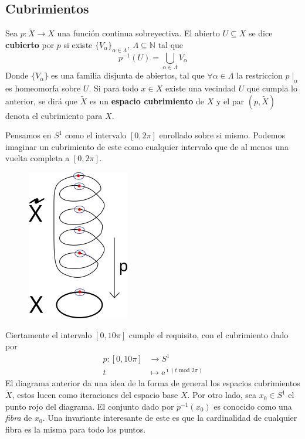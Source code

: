 \subsection{Cubrimientos}
\begin{definicion} \label{def:cubierta}
Sea \(p : \tilde{X} \to X\) una función continua sobreyectiva. El
abierto \(U \subseteq X\) se dice \textbf{cubierto} por \(p\)
si existe \(\{V_\alpha\}_{\alpha \in \Lambda},\ \Lambda \subseteq
\mathbb N\) tal que
\[ p^{-1} (U) = \bigcup_{\alpha \in \Lambda} V_\alpha \]
Donde \(\{V_\alpha\}\) es una familia disjunta de abiertos, tal que
\(\forall \alpha \in \Lambda\) la restriccion \( p \mid_{\alpha}\) es
homeomorfa sobre \(U\). Si para todo \(x \in X\) existe una vecindad
\(U\) que cumpla lo anterior, se dirá que \(\tilde{X}\) es un
\textbf{espacio cubrimiento} de \(X\) y el par \((p,\tilde X)\) denota
el cubrimiento para \(X\).
\end{definicion}

\begin{ejemplo}
  Pensamos en \(S^1\) como el intervalo \([0, 2 \pi]\) enrollado sobre
  si mismo. Podemos imaginar un cubrimiento de este como cualquier
  intervalo que de al menos una vuelta completa a \([0, 2 \pi]\).
  \begin{figure}[h]
    \centering \includegraphics[scale=0.5]{./imagenes/spring.png}
  \end{figure}
  Ciertamente el intervalo \([0, 10 \pi]\) cumple el requisito, con el
  cubrimiento dado por
  \begin{align*}
    p : [0, 10 \pi] &\longrightarrow S^1 \\
    t &\longmapsto \mathrm e ^{\imath (t \text{ mod } 2\pi)}
  \end{align*}
  El diagrama anterior da una idea de la forma de general los espacios
  cubrimientos \(\tilde X\), estos lucen como iteraciones del espacio base
  \(X\). Por otro lado, sea \(x_0 \in S^1\) el punto rojo del
  diagrama. El conjunto dado por \(p^{-1} (x_0)\) es conocido como una
  \emph{fibra} de \(x_0\). Una invariante interesante de este es que la
  cardinalidad de cualquier fibra es la misma para todo los puntos.
\end{ejemplo}

